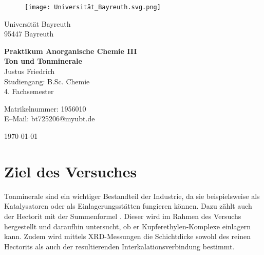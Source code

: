 \documentclass[12pt, a4paper]{article}
\begin{document}
\begin{figure}
    \texttt{[image: Universität\_Bayreuth.svg.png]}
\end{figure}



{\raggedright Universität Bayreuth\\  95447 Bayreuth}


\vspace{5cm}

\begin{center}
{\LARGE\bf{Praktikum Anorganische Chemie III}} \\  
\vspace{1cm}
{\Large\bf{Ton und Tonminerale}}\\
\vspace{0.5cm}
{\large Justus Friedrich\\}
{Studiengang: B.Sc. Chemie\\}
{4. Fachsemester}
\end{center}





\thispagestyle{empty}
\begin{center}
{\small Matrikelnummer: 1956010 \\
E–Mail:  bt725206@myubt.de}
\end{center}

\vspace{5cm}

\begin{center}
  \today
\end{center}

\newpage
\tableofcontents
\thispagestyle{empty}


\newpage

\setcounter{page}{1}
\section{Ziel des Versuches}

Tonminerale sind ein wichtiger Bestandteil der Industrie, da sie beispielsweise als Katalysatoren oder als Einlagerungsstätten fungieren können. Dazu zählt auch der Hectorit mit der Summenformel \mbox{}. 
Dieser wird im Rahmen des Versuchs hergestellt und daraufhin untersucht, ob er Kupferethylen-Komplexe einlagern kann. Zudem wird mittels XRD-Messungen die Schichtdicke sowohl des reinen Hectorits als auch der resultierenden Interkalationsverbindung bestimmt. \cite{Skript}
\end{document}
